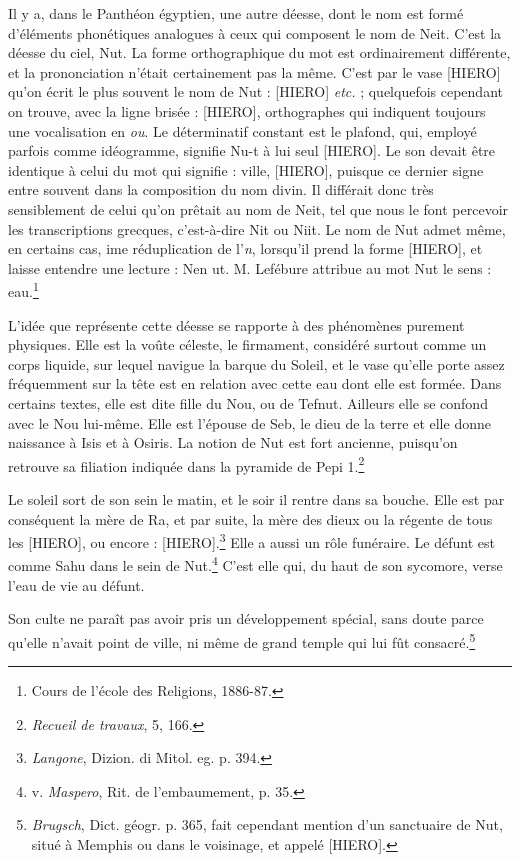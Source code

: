 \documentclass[a4paper, 11pt, oneside]{article}
\begin{document}
Il y a, dans le Panthéon égyptien, une autre déesse, dont le nom est formé d'éléments phonétiques analogues à ceux qui composent le nom de Neit. C'est la déesse du ciel, Nut. La forme orthographique du mot est ordinairement différente, et la prononciation n'était certainement pas la même. C'est par le vase [HIERO] qu'on écrit le plus souvent le nom de Nut : [HIERO] \emph{etc.} ; quelquefois cependant on trouve, avec la ligne brisée : [HIERO], orthographes qui indiquent toujours une vocalisation en \emph{ou}. Le déterminatif constant est le plafond, qui, employé parfois comme idéogramme, signifie Nu-t à lui seul [HIERO]. Le son devait être identique à celui du mot qui signifie : ville, [HIERO], puisque ce dernier signe entre souvent dans la composition du nom divin. Il différait donc très sensiblement de celui qu'on prêtait au nom de Neit, tel que nous le font percevoir les transcriptions grecques, c'est-à-dire Nit ou Niit. Le nom de Nut admet même, en certains cas, ime réduplication de l'\emph{n}, lorsqu'il prend la forme [HIERO], et laisse entendre une lecture : Nen ut. M. Lefébure attribue au mot Nut le sens : eau.\footnote{Cours de l'école des Religions, 1886-87.}

L'idée que représente cette déesse se rapporte à des phénomènes purement physiques. Elle est la voûte céleste, le firmament, considéré surtout comme un corps liquide, sur lequel navigue la barque du Soleil, et le vase qu'elle porte assez fréquemment sur la tête est en relation avec cette eau dont elle est formée. Dans certains textes, elle est dite fille du Nou, ou de Tefnut. Ailleurs elle se confond avec le Nou lui-même. Elle est l'épouse de Seb, le dieu de la terre et elle donne naissance à Isis et à Osiris. La notion de Nut est fort ancienne, puisqu'on retrouve sa filiation indiquée dans la pyramide de Pepi 1.\footnote{\emph{Recueil de travaux}, 5, 166.}

Le soleil sort de son sein le matin, et le soir il rentre dans sa bouche. Elle est par conséquent la mère de Ra, et par suite, la mère des dieux ou la régente de tous les [HIERO], ou encore : [HIERO].\footnote{\emph{Langone}, Dizion. di Mitol. eg. p. 394.} Elle a aussi un rôle funéraire. Le défunt est comme Sahu dans le sein de Nut.\footnote{v. \emph{Maspero}, Rit. de l'embaumement, p. 35.} C'est elle qui, du haut de son sycomore, verse l'eau de vie au défunt.

Son culte ne paraît pas avoir pris un développement spécial, sans doute parce qu'elle n'avait point de ville, ni même de grand temple qui lui fût consacré.\footnote{\emph{Brugsch}, Dict. géogr. p. 365, fait cependant mention d'un sanctuaire de Nut, situé à Memphis ou dans le voisinage, et appelé [HIERO].}
\end{document}

